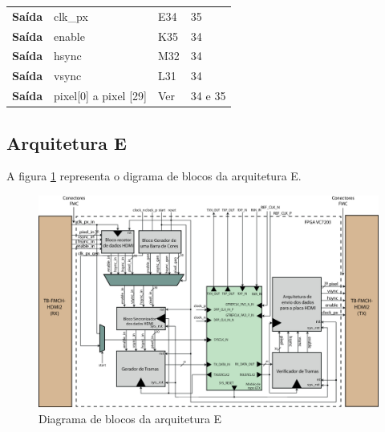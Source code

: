 \documentclass[11pt,a4paper]{article}
\begin{document}
\begin{table}[h!]
\begin{tabular}{rlll}
			\multicolumn{1}{r|}{\textbf{Saída}}   & clk\_px                            & E34                                      & 35                                         \\
			\multicolumn{1}{r|}{\textbf{Saída}}   & enable                             & K35                                      & 34                                         \\
			\multicolumn{1}{r|}{\textbf{Saída}}   & hsync                              & M32                                      & 34                                         \\
			\multicolumn{1}{r|}{\textbf{Saída}}   & vsync                              & L31                                      & 34                                         \\
			\multicolumn{1}{r|}{\textbf{Saída}}   & pixel{[}0{]} a pixel {[}29{]}      & Ver \cite{R041}                                & 34 e 35                                    \\ \hline
		\end{tabular}%
	\end{table}
	
	
	\subsection{Arquitetura E}
		A figura \ref{fig:planoE} representa o digrama de blocos da arquitetura E.
		\begin{figure}[h!]
			\begin{center}
			\includegraphics[width=1.0\textwidth]{planoE} 
			\caption{Diagrama de blocos da arquitetura E}
			\label{fig:planoE}
		\end{center}
		\end{figure}
	
\end{document}
